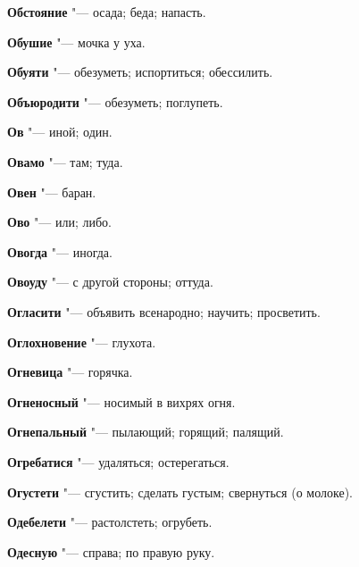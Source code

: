\begin{mymulticols}{2}
\noindent\textbf{Обстояние} "--- осада; беда; напасть. 




\noindent\textbf{Обушие} "--- мочка у уха. 




\noindent\textbf{Обуяти} "--- обезуметь; испортиться; обессилить. 




\noindent\textbf{Объюродити} "--- обезуметь; поглупеть. 




\noindent\textbf{Ов} "--- иной; один. 




\noindent\textbf{Овамо} "--- там; туда. 




\noindent\textbf{Овен} "--- баран. 




\noindent\textbf{Ово} "--- или; либо. 




\noindent\textbf{Овогда} "--- иногда. 




\noindent\textbf{Овоуду} "--- с другой стороны; оттуда. 




\noindent\textbf{Огласити} "--- объявить всенародно; научить; просветить. 




\noindent\textbf{Оглохновение} "--- глухота. 




\noindent\textbf{Огневица} "--- горячка. 




\noindent\textbf{Огненосный} "--- носимый в вихрях огня. 




\noindent\textbf{Огнепальный} "--- пылающий; горящий; палящий. 




\noindent\textbf{Огребатися} "--- удаляться; остерегаться. 




\noindent\textbf{Огустети} "--- сгустить; сделать густым; свернуться (о молоке). 




\noindent\textbf{Одебелети} "--- растолстеть; огрубеть. 




\noindent\textbf{Одесную} "--- справа; по правую руку. 





\end{mymulticols}
